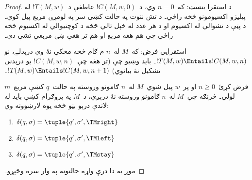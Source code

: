 \documentclass[../../../include/open-logic-section]{subfiles}
\begin{document}
\begin{proof}
د استقرا بنسټ: که~$n = 0$ وي، د~$!C(M, w, 0)$ عاطفې د~$!T(M, w)$ له پيليزو اکسيومونو څخه راځي۔ د تش ننوت په حالت کښې سر په لومړۍ مربع پيل کوي۔ د پټې د تشوالي له اکسيوم او د هر عدد له خپل تالي څخه د کوچنيوالي له اکسيوم څخه راځي چې هم هغه مربع او هم تر هغې ښۍ مربعې تشې دي۔

استقرايي فرض: که~$M$ له~$n$-م ګام څخه مخکې نۀ وي درېدلے، نو
$!T(M,w) \Entails !C(M, w, n)$۔ بايد وښيو چې (تر هغه چې~$!C(M, w,
n)$ يو درېدنی تشکيل نۀ بيانوي) $!T(M, w) \Entails !C(M, w, n+1)$۔

فرض کړئ~$n \ge 0$ او پر~$w$ پيل شوي~$M$ له~$n$ ګامونو وروسته په
حالت~$q$ کښې مربع~$m$ لولي۔ څرنګه چې~$M$ له~$n$ ګامونو وروسته نۀ
درېږي، د~$M$ په پروګرام کښې بايد له لاندې درېو بڼو څخه يوه لارښوونه
وي:

\begin{enumerate}
\item {} $\delta(q, \sigma) = \tuple{q', \sigma', \TMright}$

\item {} $\delta(q, \sigma) = \tuple{q', \sigma', \TMleft}$

\item {} $\delta(q, \sigma) = \tuple{q', \sigma', \TMstay}$
\end{enumerate}

موږ به دا درې واړه حالتونه په وار سره وڅېړو۔


\end{proof}
\end{document}
